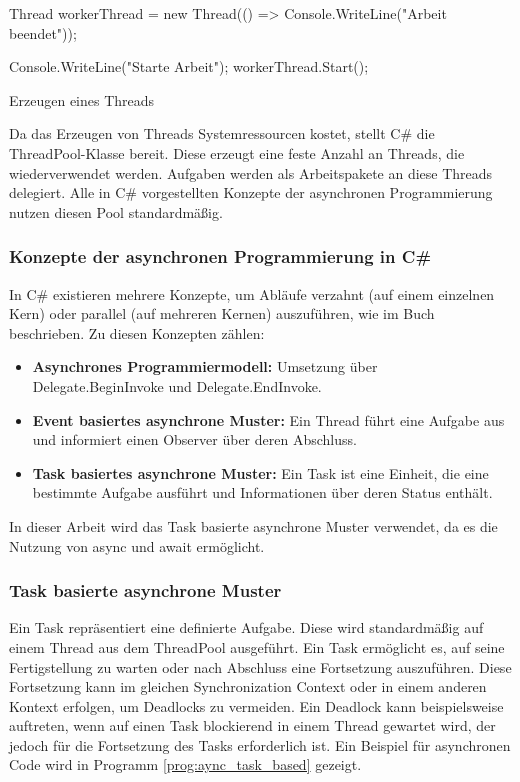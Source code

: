 \begin{program}[H]
\begin{CsCode}
Thread workerThread = new Thread(() => Console.WriteLine("Arbeit beendet"));

Console.WriteLine("Starte Arbeit");
workerThread.Start();
\end{CsCode}
\caption{Erzeugen eines Threads}
\label{prog:thread_based_programming}
\end{program}

Da das Erzeugen von Threads Systemressourcen kostet, stellt C\# die ThreadPool-Klasse bereit. Diese erzeugt eine feste Anzahl an Threads, die wiederverwendet werden. Aufgaben werden als Arbeitspakete an diese Threads delegiert. Alle in C\# vorgestellten Konzepte der asynchronen Programmierung nutzen diesen Pool standardmäßig.

\subsubsection{Konzepte der asynchronen Programmierung in C\#}
In C\# existieren mehrere Konzepte, um Abläufe verzahnt (auf einem einzelnen Kern) oder parallel (auf mehreren Kernen) auszuführen, wie im Buch \cite{sarcar2004design} beschrieben. Zu diesen Konzepten zählen:

\begin{itemize}
    \item \textbf{Asynchrones Programmiermodell:} Umsetzung über Delegate.BeginInvoke und Delegate.EndInvoke.
    \item \textbf{Event basiertes asynchrone Muster:} Ein Thread führt eine Aufgabe aus und informiert einen Observer über deren Abschluss.
    \item \textbf{Task basiertes asynchrone Muster:} Ein Task ist eine Einheit, die eine bestimmte Aufgabe ausführt und Informationen über deren Status enthält.
\end{itemize}

In dieser Arbeit wird das Task basierte asynchrone Muster verwendet, da es die Nutzung von async und await ermöglicht.

\subsubsection{Task basierte asynchrone Muster}
Ein Task \cite{Microsoft_TaskClass} repräsentiert eine definierte Aufgabe. Diese wird standardmäßig auf einem Thread aus dem ThreadPool ausgeführt. Ein Task ermöglicht es, auf seine Fertigstellung zu warten oder nach Abschluss eine Fortsetzung auszuführen. Diese Fortsetzung kann im gleichen Synchronization Context oder in einem anderen Kontext erfolgen, um Deadlocks zu vermeiden. Ein Deadlock kann beispielsweise auftreten, wenn auf einen Task blockierend in einem Thread gewartet wird, der jedoch für die Fortsetzung des Tasks erforderlich ist. Ein Beispiel für asynchronen Code wird in Programm \ref{prog:aync_task_based} gezeigt.

